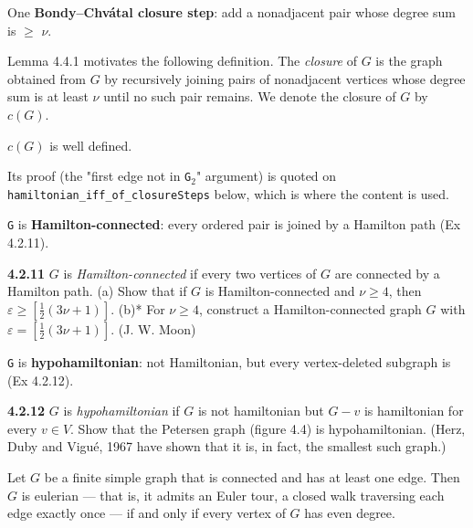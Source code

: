 \begin{definition}
\label{SimpleGraph.ClosureStep}
\leanok
One \textbf{Bondy--Chv\'atal closure step}: add a nonadjacent pair whose degree sum is
$\ge$ \texttt{$\nu$}.

Lemma 4.4.1 motivates the following definition. The \emph{closure} of $G$ is the graph
obtained from $G$ by recursively joining pairs of nonadjacent vertices whose degree sum
is at least $\nu$ until no such pair remains. We denote the closure of $G$ by $c(G)$.

$c(G)$ is well defined.

Its proof (the "first edge not in \texttt{G$_{2}$}" argument) is quoted on
\texttt{hamiltonian\_iff\_of\_closureSteps} below, which is where the content is used.
\end{definition}

\begin{definition}
\label{SimpleGraph.IsHamiltonConnected}
\leanok
\texttt{G} is \textbf{Hamilton-connected}: every ordered pair is joined by a Hamilton path (Ex 4.2.11).

\textbf{4.2.11} $G$ is \emph{Hamilton-connected} if every two vertices of $G$ are
connected by a Hamilton path. (a) Show that if $G$ is Hamilton-connected and $\nu \ge
4$, then $\varepsilon \ge [\frac{1}{2}(3\nu+1)]$. (b)* For $\nu \ge 4$, construct a
Hamilton-connected graph $G$ with $\varepsilon = [\frac{1}{2}(3\nu+1)]$. (J. W. Moon)
\end{definition}

\begin{definition}
\label{SimpleGraph.IsHypohamiltonian}
\leanok
\texttt{G} is \textbf{hypohamiltonian}: not Hamiltonian, but every vertex-deleted subgraph is (Ex 4.2.12).

\textbf{4.2.12} $G$ is \emph{hypohamiltonian} if $G$ is not hamiltonian but $G - v$ is
hamiltonian for every $v \in V$. Show that the Petersen graph (figure 4.4) is
hypohamiltonian. (Herz, Duby and Vigu\'e, 1967 have shown that it is, in fact, the
smallest such graph.)
\end{definition}

\begin{theorem}
\label{SimpleGraph.euler_tour_iff_no_odd_degree}
Let $G$ be a finite simple graph that is connected and has at least one edge. Then $G$
is eulerian — that is, it admits an Euler tour, a closed walk traversing each edge
exactly once — if and only if every vertex of $G$ has even degree.
\end{theorem}

